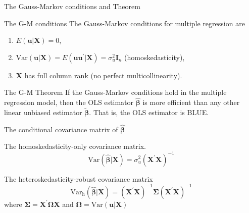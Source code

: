 \documentclass[presentation,10pt]{beamer}
\newcommand{\var}{\mathrm{Var}}
\begin{document}
\begin{frame}[label={sec:org98eec21}]{The Gauss-Markov conditions and Theorem}
\begin{block}{The G-M conditions}
The Gauss-Markov conditions for multiple regression are
\begin{enumerate}
\item \(E(\mathbf{u} | \mathbf{X}) = 0\),
\item \(\var(\mathbf{u} | \mathbf{X}) = E(\mathbf{uu}^{\prime} |
   \mathbf{X}) = \sigma^2_u \mathbf{I}_n\) (homoskedasticity),
\item \(\mathbf{X}\) has full column rank (no perfect multicollinearity).
\end{enumerate}
\end{block}

\begin{block}{The G-M Theorem}
If the Gauss-Markov conditions hold in the multiple regression model,
then the OLS estimator \(\hat{\boldsymbol{\beta}}\) is more efficient
than any other linear unbiased estimator
\(\tilde{\boldsymbol{\beta}}\). That is, the OLS estimator is BLUE.
\end{block}
\end{frame}

\begin{frame}[label={sec:org3d01705}]{The conditional covariance matrix of \(\hat{\boldsymbol{\beta}}\)}
\begin{block}{The \alert{homoskedasticity-only} covariance matrix.}
\begin{equation}
\label{eq:varbhat-hm}
\var(\hat{\boldsymbol{\beta}} | \mathbf{X}) = \sigma^2_u (\mathbf{X}^{\prime} \mathbf{X})^{-1}
\end{equation}
\end{block}

\begin{block}{The \alert{heteroskedasticity-robust covariance matrix}}
\begin{equation}
\label{eq:varbhat-ht}
\var_{\mathrm{h}}(\hat{\boldsymbol{\beta}} | \mathbf{X}) = \left(\mathbf{X}^{\prime} \mathbf{X}\right)^{-1} \boldsymbol{\Sigma} (\mathbf{X}^{\prime} \mathbf{X})^{-1}
\end{equation}
where \(\boldsymbol{\Sigma} = \mathbf{X}^{\prime}
\boldsymbol{\Omega}\mathbf{X}\) and \(\boldsymbol{\Omega} = \var(\mathbf{u} | \mathbf{X})\)
\end{block}
\end{frame}
\end{document}
